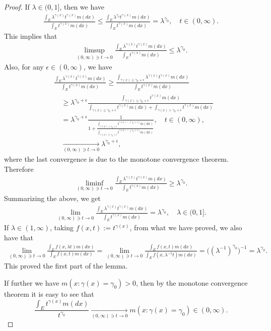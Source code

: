 \begin{proof}
	If $\lambda \in (0,1]$, then we have
\begin{align}
	\frac{\int_E \lambda^{\gamma(x)} t^{\gamma(x)} m(dx)}{\int_E t^{\gamma(x)} m(dx)}
	\leq \frac{\int_E \lambda^{\gamma_0} t^{\gamma(x)} m(dx)}{\int_E t^{\gamma(x)} m(dx)}
	= \lambda^{\gamma_0},
	\quad t\in (0,\infty).
\end{align}
	This implies that
\begin{align}
	\limsup_{(0,\infty) \ni t\to 0}\frac{\int_E \lambda^{\gamma(x)} t^{\gamma(x)} m(dx)}{\int_E t^{\gamma(x)} m(dx)}	
	\leq \lambda ^{\gamma_0}.
\end{align}
	Also, for any $\epsilon \in (0,\infty)$, we have
\begin{align}
	&\frac{\int_E \lambda^{\gamma(x)} t^{\gamma(x)} m(dx)}{\int_E t^{\gamma(x)} m(dx)}
	\geq \frac{ \int_{ \gamma(x) \leq  \gamma_0 + \epsilon } \lambda^{ \gamma(x) } t^{ \gamma(x)} m(dx) } { \int_E t^{ \gamma(x) } m(dx) }
	\\&\quad \geq \lambda^{ \gamma_0 + \epsilon} \frac{ \int_{ \gamma(x) \leq \gamma_0 + \epsilon } t^{ \gamma(x)} m(dx) } { \int_{ \gamma(x) \leq \gamma_0 + \epsilon}t^{\gamma(x)}m(dx)+ \int_{\gamma(x) > \gamma_0 + \epsilon} t^{\gamma(x)}m(dx)}
	\\&\quad = \lambda^{\gamma_0 + \epsilon} \frac{1}{1+ \frac{\int_{\gamma(x) > \gamma_0 + \epsilon}t^{\gamma(x) - (\gamma_0 + \epsilon)}m(dx)}{\int_{\gamma(x) \leq \gamma_0 + \epsilon}t^{\gamma(x)- (\gamma_0 + \epsilon)}m(dx)}},
	\quad t\in (0, \infty),
	\\&\quad \xrightarrow[(0,\infty) \ni t\to 0]{}
	\lambda ^{\gamma_0 + \epsilon},
\end{align}
	where the last convergence is due to the monotone convergence theorem.
	Therefore
\begin{align}
	\liminf_{(0,\infty) \ni t\to 0}\frac{\int_E \lambda^{\gamma(x)} t^{\gamma(x)} m(dx)}{\int_E t^{\gamma(x)} m(dx)}
	\geq \lambda ^{\gamma_0}.
\end{align}
	Summarizing the above,  we get
\begin{align}
	\lim_{(0,\infty) \ni t\to 0}\frac{\int_E \lambda^{\gamma(x)} t^{\gamma(x)} m(dx)}{\int_E t^{\gamma(x)} m(dx)}
	= \lambda ^{\gamma_0},	
	\quad \lambda \in (0,1].
\end{align}
	If $\lambda \in (1,\infty)$, taking $f(x, t):= t^{\gamma(x)}$, from what we have proved, we also have that
\begin{align}
	\lim_{(0,\infty)\ni t\to 0}\frac{\int_E f(x,\lambda t)m(dx)}{\int_E f(x, t)m(dx)}
	= \lim_{(0,\infty)\ni t\to 0}\frac{\int_E f(x,t)m(dx)}{\int_E f(x, \lambda^{-1} t)m(dx)}
	= \big((\lambda^{-1})^{\gamma_0} \big)^{-1}
	= \lambda ^{\gamma_0}.
\end{align}
	This proved the first part of the lemma.
	
	If further 
	we have $m(x:\gamma(x) = \gamma_0)>0$,
	then by the monotone convergence theorem  it is easy to see that
\begin{equation}
	\frac{\int_E t^{\gamma(x)} m(dx)}{t^{\gamma_0}}
	\xrightarrow[(0,\infty)\ni t\to 0]{} m(x:\gamma(x) = \gamma_0)\in (0,\infty).
\end{equation}
\end{proof}

